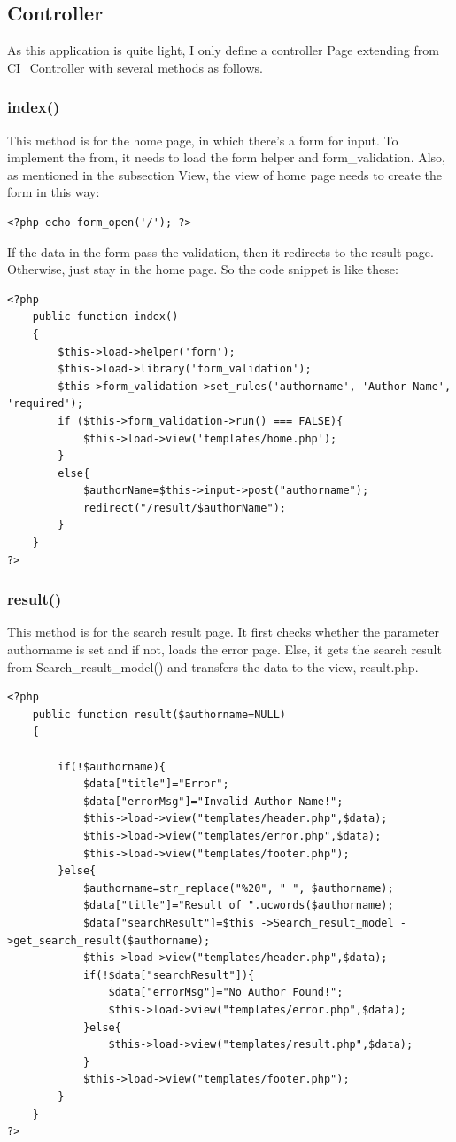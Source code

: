 \documentclass[a4paper]{article}
\begin{document}
        \subsection{Controller}
As this application is quite light, I only define a controller Page extending from CI\_Controller with several methods as follows.
            \subsubsection{index()}
This method is for the home page, in which there's a form for input. To implement the from, it needs to load the form helper and form\_validation. Also, as mentioned in the subsection View, the view of home page needs to create the form in this way:
                \begin{verbatim}
<?php echo form_open('/'); ?>
                \end{verbatim}
If the data in the form pass the validation, then it redirects to the result page. Otherwise, just stay in the home page. So the code snippet is like these:
                \begin{verbatim}
<?php
    public function index()
    {
        $this->load->helper('form');
        $this->load->library('form_validation');
        $this->form_validation->set_rules('authorname', 'Author Name', 'required');
        if ($this->form_validation->run() === FALSE){
            $this->load->view('templates/home.php');
        }
        else{
            $authorName=$this->input->post("authorname");
            redirect("/result/$authorName");
        }
    }
?>
                \end{verbatim}
            \subsubsection{result()}
This method is for the search result page. It first checks whether the parameter authorname is set and if not, loads the error page. Else, it gets the search result from Search\_result\_model() and transfers the data to the view, result.php.
                \begin{verbatim}
<?php
    public function result($authorname=NULL)
    {

        if(!$authorname){
            $data["title"]="Error";
            $data["errorMsg"]="Invalid Author Name!";
            $this->load->view("templates/header.php",$data);
            $this->load->view("templates/error.php",$data);
            $this->load->view("templates/footer.php");
        }else{
            $authorname=str_replace("%20", " ", $authorname);
            $data["title"]="Result of ".ucwords($authorname);
            $data["searchResult"]=$this ->Search_result_model ->get_search_result($authorname);
            $this->load->view("templates/header.php",$data);
            if(!$data["searchResult"]){
                $data["errorMsg"]="No Author Found!";
                $this->load->view("templates/error.php",$data);
            }else{
                $this->load->view("templates/result.php",$data);
            }
            $this->load->view("templates/footer.php");
        }
    }
?>
                \end{verbatim}
\end{document}
